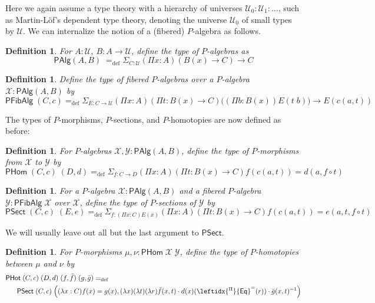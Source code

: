 \documentclass[10pt,a4paper,oneside,reqno]{amsart}
\numberwithin{equation}{section}
\theoremstyle{mythm}
\theoremstyle{mydef}
\newtheorem{definition}[theorem]{Definition}
\theoremstyle{myrmk}
\newcommand{\defeq}{=_{\mathrm{def}}}
\newcommand{\U}{\mathcal{U}}
\newcommand{\ct}{\cdot}
\newcommand{\funext}{\leftidx{^\Pi}{\mathsf{Eq}}^{=}}
\newcommand{\sm}[1]{\Sigma_{#1}}
\newcommand{\WCell}{\mathsf{PHot}}
\newcommand{\WAlg}{\mathsf{PAlg}}
\newcommand{\WFibAlg}{\mathsf{PFibAlg}}
\newcommand{\WHom}{\mathsf{PHom}}
\newcommand{\WFibHom}{\mathsf{PSect}}
\newcommand{\X}{\mathcal{X}}
\newcommand{\Y}{\mathcal{Y}}
\begin{document}
Here we again assume a type theory with a hierarchy of universes $\U_0 : \U_1 : \ldots$, such as Martin-L{\"o}f's dependent type theory, denoting the universe $\U_0$ of small types by $\U$. We can internalize the notion of a (fibered) $P$-algebra as follows.

\begin{definition}\label{def:WAlg}
For $A:\U$, $B : A \to \U$, define the type of \emph{$P$-algebras} as
\[\WAlg(A,B) \; \defeq \sm{C : \U} (\Pi x:A) (B(x) \to C) \to C \]
\end{definition}

\begin{definition}\label{def:WFibAlg}
Define the type of \emph{fibered $P$-algebras} over a $P$-algebra $\X : \WAlg(A,B)$ by
\[\WFibAlg \; (C,c) \defeq \sm{E : C \to \U} (\Pi x:A) (\Pi t: B(x) \to C) \big((\Pi b:B(x)) E(t \;b) \big) \to E(c(a,t)) \]
\end{definition}

\noindent The types of $P$-morphisms, $P$-sections, and $P$-homotopies are now defined as before:

\begin{definition}\label{def:WHom}
For $P$-algebras $\X,\Y : \WAlg(A,B)$, define the type of \emph{$P$-morphisms} from $\X$ to $\Y$ by
\[ \WHom \; (C,c) \; (D,d) \defeq \sm{f:C\to D} (\Pi x:A) (\Pi t: B(x) \to C) f(c(a,t)) = d(a,f \circ t) \]
\end{definition}

\begin{definition}\label{def:WFibHom}
For a $P$-algebra $\X : \WAlg(A,B)$ and a fibered $P$-algebra $\Y : \WFibAlg \; \X$ over $\X$, define the type of \emph{$P$-sections} of $\Y$ by
\[ \WFibHom \; (C,c) \; (E,e) \defeq \sm{f:(\Pi x:C)E(x)}(\Pi x:A) (\Pi t: B(x) \to C) f(c(a,t)) = e(a,t,f \circ t) \]
\end{definition}
We will usually leave out all but the last argument to $\WFibHom$.

\begin{definition}\label{def:WCell}
For $P$-morphisms $\mu, \nu : \WHom \; \X \; \Y$, define the type of \emph{$P$-homotopies} between $\mu$ and $\nu$ by
\begin{align*} 
& \WCell \; (C,c) \; (D,d) \; (f,\bar{f}) \; (g,\bar{g}) \defeq \\ & \;\;\; \;\;\;\WFibHom \; (C,c) \; \Big((\lambda x:C) f(x) = g(x), (\lambda x) (\lambda t) (\lambda r) \bar{f}(x,t) \ct d(x)(\funext(r)) \ct \bar{g}(x,t)^{-1}\Big)
\end{align*}
\end{definition}
\end{document}
